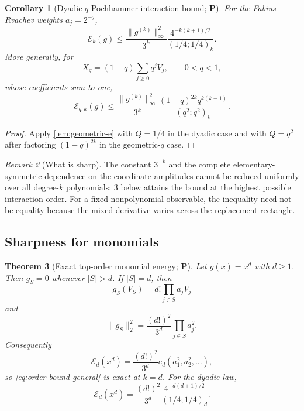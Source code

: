 \documentclass[11pt,oneside]{article}
\newtheorem{theorem}{Theorem}[section]
\newtheorem{corollary}[theorem]{Corollary}
\theoremstyle{definition}
\theoremstyle{remark}
\newtheorem{remark}[theorem]{Remark}
\newcommand{\Ecal}{\mathcal E}
\newcommand{\statusP}{\textcolor{deepgreen}{\textbf{P}}}
\begin{document}
\begin{corollary}[Dyadic $q$-Pochhammer interaction bound; \statusP]
\label{cor:dyadic-interaction}
For the Fabius--Rvachev weights $a_j=2^{-j}$,
\begin{equation}
 \boxed{
 \Ecal_k(g)
 \le \frac{\|g^{(k)}\|_\infty^2}{3^k}
 \frac{4^{-k(k+1)/2}}{(1/4;1/4)_k}.}
 \label{eq:dyadic-interaction-bound}
\end{equation}
More generally, for
\begin{equation}
 X_q=(1-q)\sum_{j\ge0}q^jV_j,
 \qquad 0<q<1,
 \label{eq:X-q}
\end{equation}
whose coefficients sum to one,
\begin{equation}
 \boxed{
 \Ecal_{q,k}(g)
 \le\frac{\|g^{(k)}\|_\infty^2}{3^k}
 \frac{(1-q)^{2k}q^{k(k-1)}}{(q^2;q^2)_k}.}
 \label{eq:q-interaction-bound}
\end{equation}
\end{corollary}

\begin{proof}
Apply \cref{lem:geometric-e} with $Q=1/4$ in the dyadic case and with
$Q=q^2$ after factoring $(1-q)^{2k}$ in the geometric-$q$ case.
\end{proof}

\begin{remark}[What is sharp]
The constant $3^{-k}$ and the complete elementary-symmetric dependence on the
coordinate amplitudes cannot be reduced uniformly over all degree-$k$
polynomials: \cref{thm:monomial-sharp} below attains the bound at the highest
possible interaction order.  For a fixed nonpolynomial observable, the
inequality need not be equality because the mixed derivative varies across the
replacement rectangle.
\end{remark}

\subsection{Sharpness for monomials}

\begin{theorem}[Exact top-order monomial energy; \statusP]
\label{thm:monomial-sharp}
Let $g(x)=x^d$ with $d\ge1$.  Then $g_S=0$ whenever $|S|>d$.  If $|S|=d$, then
\begin{equation}
 g_S(V_S)=d!\prod_{j\in S}a_jV_j
 \label{eq:top-monomial-component}
\end{equation}
and
\begin{equation}
 \|g_S\|_2^2=\frac{(d!)^2}{3^d}\prod_{j\in S}a_j^2.
 \label{eq:top-monomial-norm}
\end{equation}
Consequently
\begin{equation}
 \boxed{
 \Ecal_d(x^d)=\frac{(d!)^2}{3^d}e_d(a_1^2,a_2^2,\ldots),}
 \label{eq:top-monomial-energy}
\end{equation}
so \eqref{eq:order-bound-general} is exact at $k=d$.
For the dyadic law,
\begin{equation}
 \Ecal_d(x^d)=
 \frac{(d!)^2}{3^d}
 \frac{4^{-d(d+1)/2}}{(1/4;1/4)_d}.
 \label{eq:dyadic-top-energy}
\end{equation}
\end{theorem}
\end{document}
